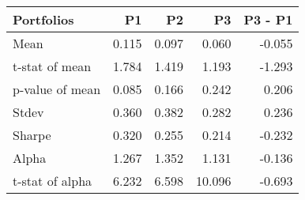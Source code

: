 \begin{tabular}{lrrrr}
\toprule
Portfolios & P1 & P2 & P3 & P3 - P1 \\
\midrule
Mean & 0.115 & 0.097 & 0.060 & -0.055 \\
t-stat of mean & 1.784 & 1.419 & 1.193 & -1.293 \\
p-value of mean & 0.085 & 0.166 & 0.242 & 0.206 \\
Stdev & 0.360 & 0.382 & 0.282 & 0.236 \\
Sharpe & 0.320 & 0.255 & 0.214 & -0.232 \\
Alpha & 1.267 & 1.352 & 1.131 & -0.136 \\
t-stat of alpha & 6.232 & 6.598 & 10.096 & -0.693 \\
\bottomrule
\end{tabular}
